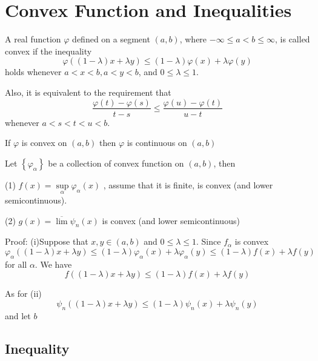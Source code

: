 \documentclass[12pt, a4paper, oneside]{book}
\begin{document}
\section{Convex Function and Inequalities}
\begin{definition}
    A real function $\varphi$ defined on a segment $( a, b )$, where $-\infty \leq a<b \leq \infty$, is called convex if the inequality
    $$
        \varphi((1-\lambda) x+\lambda y) \leq(1-\lambda) \varphi(x)+\lambda \varphi(y)
    $$
    holds whenever $a<x<b, a<y<b$, and $0 \leq \lambda \leq 1$.

    Also, it is equivalent to the requirement that
    $$
        \frac{\varphi(t)-\varphi(s)}{t-s}
        \leq
        \frac{\varphi(u)-\varphi(t)}{u-t}
    $$
    whenever $a<s<t<u<b$.
\end{definition}
\begin{theorem}
    If $\varphi$ is convex on $(a, b)$ then $\varphi$ is continuous on $(a, b)$
\end{theorem}
\begin{theorem}
    Let $\left\{ \varphi_\alpha\right\}$ be a collection of convex function on $(a,b)$, then

    (1) $ f(x) = \sup\limits_\alpha \varphi_\alpha (x)$
    , assume that it is finite, is convex (and lower semicontinuous).

    (2) $g(x) = \overline{\lim} \psi_n (x)$ is convex (and lower semicontinuous)

    Proof: (i)Suppose that $x,y \in (a,b)$ and $0 \leq \lambda \leq 1$. Since $f_\alpha$ is convex
    $$
        \varphi_\alpha ((1-\lambda) x+\lambda y)
        \leq (1-\lambda) \varphi_\alpha (x)+\lambda \varphi_\alpha (y)
        \leq (1-\lambda) f (x)+\lambda f(y)
    $$
    for all $\alpha$. We have
    $$
        f((1-\lambda) x+\lambda y) \leq (1-\lambda) f (x)+\lambda f(y)
    $$

    As for (ii)
    $$
        \psi_n ((1-\lambda) x+\lambda y)
        \leq (1-\lambda) \psi_n (x)+\lambda \psi_n (y)
    $$
    and let $b$
\end{theorem}
\begin{corollary}

\end{corollary}

\subsection{Inequality}
\end{document}
